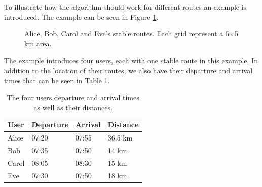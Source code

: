 To illustrate how the algorithm should work for different routes an example is introduced. The example can be seen in Figure \ref{fig:algEx1}.
\begin{figure}[!ht]
    \centering
{}
    \caption{Alice, Bob, Carol and Eve's stable routes. Each grid represent a 5$\times$5 km area.}
    \label{fig:algEx1}
\end{figure}
The example introduces four users, each with one stable route in this example. In addition to the location of their routes, we also have their departure and arrival times that can be seen in Table \ref{timetable}.
\DIFdelbegin %
\DIFdelend \begin{table}[]
\centering
\begin{tabular}{@{}llll@{}}
\toprule
\textbf{User} & \textbf{Departure} & \textbf{Arrival} & \textbf{Distance} 	\\ \midrule
Alice         & 07:20                   & 07:55       & 36.5 km 			\\
Bob           & 07:35                   & 07:50       & 14 km  		  		\\
Carol         & 08:05                   & 08:30       & 15 km         		\\
Eve           & 07:30                   & 07:50       & 18 km         		\\ \bottomrule
\end{tabular}
\caption{The four users departure and arrival times as well as their distances.}
\label{timetable}
\end{table}

